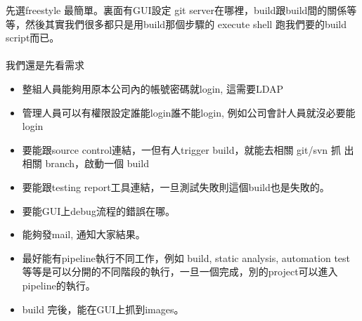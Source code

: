  先選freestyle 最簡單。裏面有GUI設定 git server在哪裡，build跟build間的關係等
  等，然後其實我們很多都只是用build那個步驟的 execute shell 跑我們要的build
  script而已。
  \\\\
  我們還是先看需求
  \begin{itemize}
    \item 整組人員能夠用原本公司內的帳號密碼就login, 這需要LDAP
    \item 管理人員可以有權限設定誰能login誰不能login, 例如公司會計人員就沒必要能
      login
    \item 要能跟source control連結，一但有人trigger build，就能去相關 git/svn 抓
      出相關 branch，啟動一個 build
    \item 要能跟testing report工具連結，一旦測試失敗則這個build也是失敗的。
    \item 要能GUI上debug流程的錯誤在哪。
    \item 能夠發mail, 通知大家結果。
    \item 最好能有pipeline執行不同工作，例如 build, static analysis, automation
      test 等等是可以分開的不同階段的執行，一旦一個完成，別的project可以進入
      pipeline的執行。
    \item build 完後，能在GUI上抓到images。
  \end{itemize}

